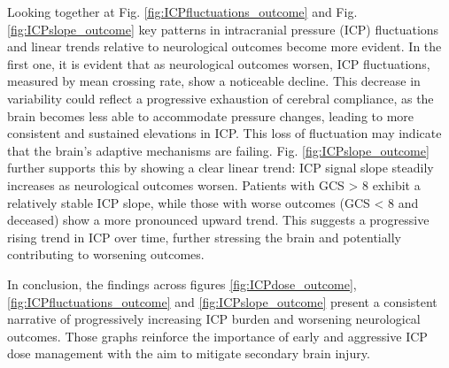 Looking together at Fig. \ref{fig:ICPfluctuations_outcome} and Fig. \ref{fig:ICPslope_outcome} key patterns in intracranial pressure (ICP) fluctuations and linear trends relative to neurological outcomes become more evident. In the first one, it is evident that as neurological outcomes worsen, ICP fluctuations, measured by mean crossing rate, show a noticeable decline. This decrease in variability could reflect a progressive exhaustion of cerebral compliance, as the brain becomes less able to accommodate pressure changes, leading to more consistent and sustained elevations in ICP. This loss of fluctuation may indicate that the brain’s adaptive mechanisms are failing. Fig. \ref{fig:ICPslope_outcome} further supports this by showing a clear linear trend: ICP signal slope steadily increases as neurological outcomes worsen. Patients with GCS > 8 exhibit a relatively stable ICP slope, while those with worse outcomes (GCS < 8 and deceased) show a more pronounced upward trend. This suggests a progressive rising trend in ICP over time, further stressing the brain and potentially contributing to worsening outcomes. 

In conclusion, the findings across figures \ref{fig:ICPdose_outcome}, \ref{fig:ICPfluctuations_outcome} and \ref{fig:ICPslope_outcome} present a consistent narrative of progressively increasing ICP burden and worsening neurological outcomes. Those graphs reinforce the importance of early and aggressive ICP dose management with the aim to mitigate secondary brain injury.\\

